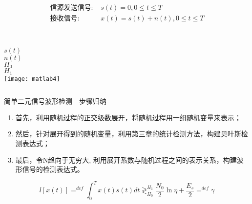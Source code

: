 \begin{frame}[shrink]
\begin{align*}
\text{信源发送信号: } &s(t)=0,0 \le t\le T\\
\text{接收信号: } &x(t)=s(t)+n(t), 0\le t\le T
\end{align*}
\begin{columns}%
	~\\
	\vspace{0.2cm}
	$s(t)$\\
	\vspace{0.5cm}
	$n(t)$\\
	\vspace{0.5cm}
	$H_0$\\
	\vspace{0.5cm}
	$H_1$\\
	\texttt{[image: matlab4]}
\end{columns}
\end{frame}

\begin{frame}{简单二元信号波形检测---步骤归纳}
\begin{enumerate}
	\setlength{\itemsep}{.5cm}
	\item 首先，利用随机过程的正交级数展开，将随机过程用一组随机变量来表示；
	\item 然后，针对展开得到的随机变量，利用第三章的统计检测方法，构建贝叶斯检测表达式；
	\item 最后，令N趋向于无穷大, 利用展开系数与随机过程之间的表示关系，构建波形信号的检测表达式。
\end{enumerate}
\[ l[x(t)]\mathop{=}^{def}\int_{0}^{T}x(t)s(t)dt\mathop{\gtrless}_{H_0}^{H_1}\frac{N_0}{2}\ln\eta+\frac{E_s}{2}\mathop{=}^{def}\gamma \]
\end{frame}

